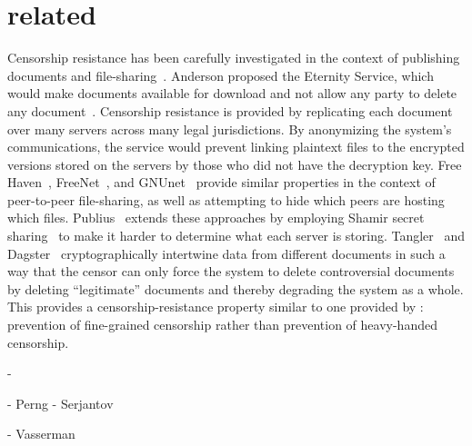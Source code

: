 \section{related}

Censorship resistance has been carefully investigated in the context of
publishing documents and
file-sharing~\cite{eternity,freehaven,freenet,gnunet-esed,publius,tangler,dagster}.
Anderson proposed the Eternity Service, which would make documents
available for download and not allow any party to delete any
document~\cite{eternity}. Censorship resistance is provided by
replicating each document over many servers across many legal
jurisdictions. By anonymizing the system's communications, the service
would prevent linking plaintext files to the encrypted versions stored
on the servers by those who did not have the decryption key. Free
Haven~\cite{freehaven}, FreeNet~\cite{freenet}, and GNUnet~\cite{gnunet}
provide similar properties in the context of peer-to-peer file-sharing,
as well as attempting to hide which peers are hosting which
files. Publius~\cite{publius} extends these approaches by employing
Shamir secret sharing~\cite{shamir} to make it harder to determine what
each server is storing. Tangler~\cite{tangler} and
Dagster~\cite{dagster} cryptographically intertwine data from different
documents in such a way that the censor can only force the system to
delete controversial documents by deleting ``legitimate'' documents and
thereby degrading the system as a whole. This provides a
censorship-resistance property similar to one provided by \hoot:
prevention of fine-grained censorship rather than prevention of
heavy-handed censorship.

- 


- Perng
- Serjantov

- Vasserman
